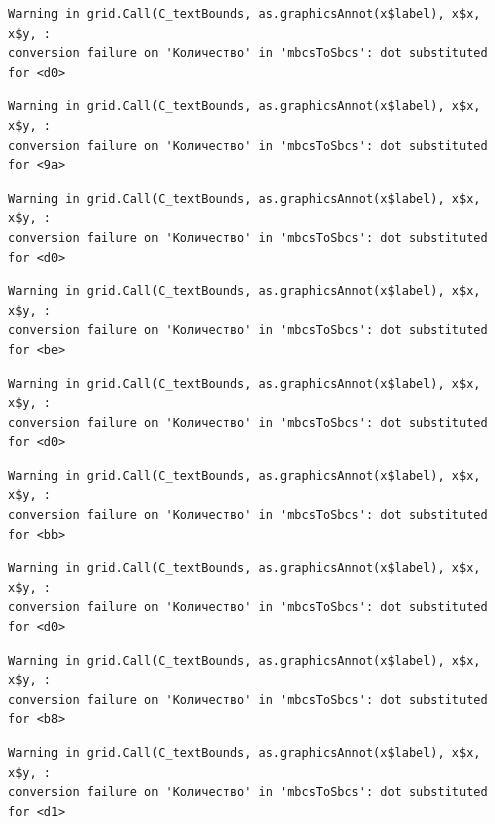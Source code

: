 \documentclass[
  letterpaper,
]{scrbook}
\theoremstyle{definition}
\theoremstyle{remark}
\begin{document}
\begin{verbatim}
Warning in grid.Call(C_textBounds, as.graphicsAnnot(x$label), x$x, x$y, :
conversion failure on 'Количество' in 'mbcsToSbcs': dot substituted for <d0>
\end{verbatim}

\begin{verbatim}
Warning in grid.Call(C_textBounds, as.graphicsAnnot(x$label), x$x, x$y, :
conversion failure on 'Количество' in 'mbcsToSbcs': dot substituted for <9a>
\end{verbatim}

\begin{verbatim}
Warning in grid.Call(C_textBounds, as.graphicsAnnot(x$label), x$x, x$y, :
conversion failure on 'Количество' in 'mbcsToSbcs': dot substituted for <d0>
\end{verbatim}

\begin{verbatim}
Warning in grid.Call(C_textBounds, as.graphicsAnnot(x$label), x$x, x$y, :
conversion failure on 'Количество' in 'mbcsToSbcs': dot substituted for <be>
\end{verbatim}

\begin{verbatim}
Warning in grid.Call(C_textBounds, as.graphicsAnnot(x$label), x$x, x$y, :
conversion failure on 'Количество' in 'mbcsToSbcs': dot substituted for <d0>
\end{verbatim}

\begin{verbatim}
Warning in grid.Call(C_textBounds, as.graphicsAnnot(x$label), x$x, x$y, :
conversion failure on 'Количество' in 'mbcsToSbcs': dot substituted for <bb>
\end{verbatim}

\begin{verbatim}
Warning in grid.Call(C_textBounds, as.graphicsAnnot(x$label), x$x, x$y, :
conversion failure on 'Количество' in 'mbcsToSbcs': dot substituted for <d0>
\end{verbatim}

\begin{verbatim}
Warning in grid.Call(C_textBounds, as.graphicsAnnot(x$label), x$x, x$y, :
conversion failure on 'Количество' in 'mbcsToSbcs': dot substituted for <b8>
\end{verbatim}

\begin{verbatim}
Warning in grid.Call(C_textBounds, as.graphicsAnnot(x$label), x$x, x$y, :
conversion failure on 'Количество' in 'mbcsToSbcs': dot substituted for <d1>
\end{verbatim}
\end{document}
